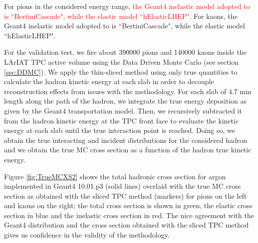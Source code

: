 For pions in the considered energy range, \textcolor{red}{the Geant4 inelastic model adopted to is ``BertiniCascade", while the elastic model ``hElasticLHEP".}
For kaons, the Geant4 inelastic model adopted to is ``BertiniCascade", while the elastic model ``hElasticLHEP".  


For the validation test, we fire about 390000 pions and 140000 kaons inside the LArIAT TPC active volume using the Data Driven Monte Carlo (see section \ref{sec:DDMC}). We apply  the thin-sliced method using only true quantities to calculate the hadron kinetic energy at each slab in order to decouple reconstruction effects from issues with the methodology.  For each slab of 4.7 mm length along the path of the hadron, we integrate the true energy deposition as given by the Geant4 transportation model. Then, we recursively subtracted it from the hadron kinetic energy at the TPC front face to evaluate the kinetic energy at each slab until the true interaction point is reached. Doing so, we obtain the true interacting and incident distributions for the considered hadron and we obtain the true MC cross section as a function of the hadron true kinetic energy. 

Figure \ref{fig:TrueMCXS2} shows the total hadronic cross section for argon implemented in Geant4 10.01.p3 (solid lines) overlaid with the true MC cross section as obtained with the sliced TPC method (markers) for pions on the left and kaons on the right; the total cross section is shown in green,  the elastic cross section in blue and the inelastic cross section in red.  The nice agreement with the Geant4 distribution and the cross section  obtained with the sliced TPC method gives us confidence in the  validity of the methodology. 
        

